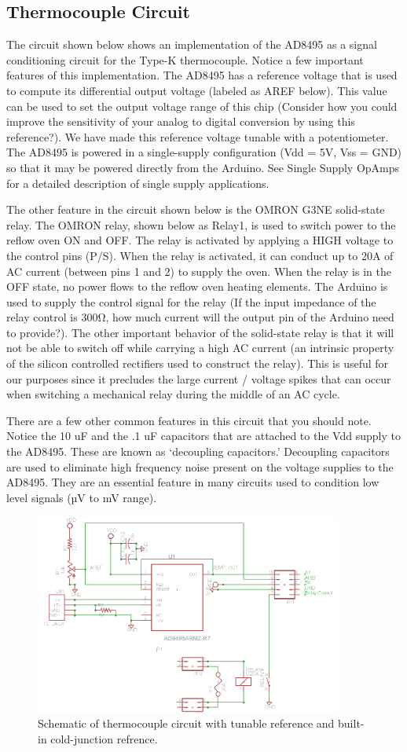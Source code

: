 \documentclass[10pt]{report}
\begin{document}
\subsection*{Thermocouple Circuit}
	The circuit shown below shows an implementation of the AD8495 as a signal conditioning circuit for the Type-K thermocouple. Notice a few important features of this implementation. The AD8495 has a reference voltage that is used to compute its differential output voltage (labeled as AREF below). This value can be used to set the output voltage range of this chip (Consider how you could improve the sensitivity of your analog to digital conversion by using this reference?). We have made this reference voltage tunable with a potentiometer. The AD8495 is powered in a single-supply configuration (Vdd = 5V, Vss = GND) so that it may be powered directly from the Arduino. See Single Supply OpAmps for a detailed description of single supply applications.
 \par
	The other feature in the circuit shown below is the OMRON G3NE solid-state relay. The OMRON relay, shown below as Relay1, is used to switch power to the reflow oven ON and OFF. The relay is activated by applying a HIGH voltage to the control pins (P/S). When the relay is activated, it can conduct up to 20A of AC current (between pins 1 and 2) to supply the oven. When the relay is in the OFF state, no power flows to the reflow oven heating elements. The Arduino is used to supply the control signal for the relay (If the input impedance of the relay control is 300Ω, how much current will the output pin of the Arduino need to provide?). The other important behavior of the solid-state relay is that it will not be able to switch off while carrying a high AC current (an intrinsic property of the silicon controlled rectifiers used to construct the relay). This is useful for our purposes since it precludes the large current / voltage spikes that can occur when switching a mechanical relay during the middle of an AC cycle.
\par
	There are a few other common features in this circuit that you should note. Notice the 10 uF and the .1 uF capacitors that are attached to the Vdd supply to the AD8495. These are known as ‘decoupling capacitors.’ Decoupling capacitors are used to eliminate high frequency noise present on the voltage supplies to the AD8495. They are an essential feature in many circuits used to condition low level signals (µV to mV range).


\begin{figure}[H]
\centering
   \includegraphics[width=0.9\textwidth]{Thermocouple_Circuit.png}
    \caption{Schematic of thermocouple circuit with tunable reference and built-in cold-junction refrence.}
\end{figure}
\end{document}
